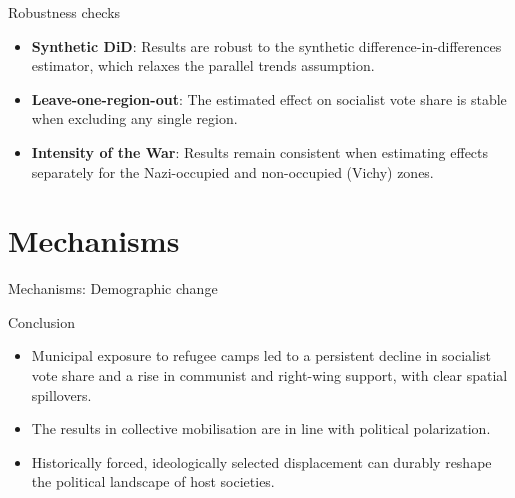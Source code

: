 \documentclass[aspectratio=169]{beamer}
\begin{document}
\begin{frame}[label=Robustness]{Robustness checks}

\begin{itemize}

\item \textbf{Synthetic DiD}:
Results are robust to the synthetic difference-in-differences estimator, which relaxes the parallel trends assumption.
\hyperlink{robustness0}{}

\bigskip

\item \textbf{Leave-one-region-out}:
The estimated effect on socialist vote share is stable when excluding any single region.
\hyperlink{robustness1}{}

\bigskip

\item \textbf{Intensity of the War}:
Results remain consistent when estimating effects separately for the Nazi-occupied and non-occupied (Vichy) zones.
\hyperlink{robustness2}{}

\end{itemize}

\end{frame}




\section{Mechanisms}

\begin{frame}[label=refugees]{Mechanisms: Demographic change}



\hyperlink{settlement}{}

\end{frame}




\begin{frame}{Conclusion}

\begin{itemize}
  \item Municipal exposure to refugee camps led to a persistent decline in socialist vote share and a rise in communist and right-wing support, with clear spatial spillovers.
  \item The results in collective mobilisation are in line with political polarization.
  \item Historically forced, ideologically selected displacement can durably reshape the political landscape of host societies.
\end{itemize}

\end{frame}
\end{document}
